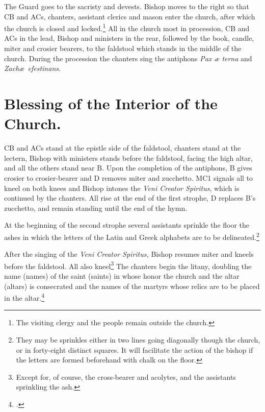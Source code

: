 \documentclass[letterpaper]{report}
\begin{document}
{\rubric The Guard goes to the sacristy and devests. Bishop moves to the right so
that CB and ACs, chanters, assistant clerics and mason enter the church, after
which the church is closed and locked.\footnote{The visiting clergy and the
people remain outside the church.} All in the church most in procession, CB and
ACs in the lead, Bishop and ministers in the rear, followed by the book, candle,
miter and crosier bearers, to the faldstool which stands in the middle of the
church. During the procession the chanters sing the antiphons \textit{Pax \ae
terna} and \textit{Zach\ae\ efestinans.}

\section{Blessing of the Interior of the Church.}

\rubric CB and ACs stand at the epistle side of the faldstool, chanters stand
at the lectern, Bishop with ministers stands before the faldstool, facing the high
altar, and all the others stand near B. Upon the completion of the antiphons, B
gives crosier to crosier-bearer and D removes miter and zucchetto. MC1 signals
all to kneel on both knees and Bishop intones the \textit{Veni Creator Spiritus},
which is continued by the chanters. All rise at the end of the first strophe, D
replaces B's zucchetto, and remain standing until the end of the hymn.

\rubric At the beginning of the second strophe several assistants sprinkle the
floor the ashes in which the letters of the Latin and Greek alphabets are to be
delineated.\footnote{They may be sprinkles either in two lines going diagonally
though the church, or in forty-eight distinct squares. It will facilitate the
action of the bishop if the letters are formed beforehand with chalk on the
floor.}

\rubric After the singing of the \textit{Veni Creator Spiritus,} Bishop resumes
miter and kneels before the faldstool. All also kneel\footnote{Except for, of
course, the cross-bearer and acolytes, and the assistants sprinkling the ash.}
The chanters begin the litany, doubling the name (names) of the saint (saints)
in whose honor the church and the altar (altars) is consecrated and the names
of the martyrs whose relics are to be placed in the altar.\footcite[If the name
of any of these saints is inscried in the litany, e.g., St. Peter, St. Stephen,
it is invoked a second time immediately after the proper invocation in the
Litany. If the name is not in the Litany, it is inserted after the
\textit{individual} invocations of the saints of the same category, but before
the general invocation, e.g., if the church is consecrated in honor of St.
Francis de Sales, his name is inserted twice after \textit{Sancte Nicol\ae} and
before \textit{Omnes sancti Pontifices et Confessores.} If the church or altar
is consecrated in honor of the Blessed Virgin under any title whatever the
invocation \textit{Sancta Maria} is mentioned twice; if in honor of a mystery
of the Life and Passion of Our Lord, the petition \textit{Fili Redemptor mundi
Deus} is repeated.][Note, p. 51.]{consecranda}

}
\end{document}
